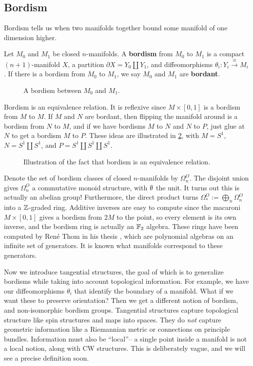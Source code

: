 \subsection*{Bordism}
Bordism tells us when two manifolds together bound some manifold of one dimension higher.
\begin{definition}[]
    Let $M_0$ and $M_1$ be closed $n$-manifolds. A \textbf{bordism} from $M_0$ to $M_1$ is a compact $(n+1)$-manifold $X$, a partition $\partial X=Y_0\amalg Y_1$, and diffeomorphisms $\theta _i  \colon Y_i  \xrightarrow{\cong} M_i $. If there is a bordism from $M_0$ to $M_1$, we say $M_0$ and $M_1$ are \textbf{bordant}.
\end{definition}

\begin{figure}
\centering
{}
\caption{A bordism between $M_0$ and $M_1$.}
\label{pair_of_pants}
\end{figure}

Bordism is an equivalence relation. It is reflexive since $M \times [0,1]$ is a bordism from $M$ to $M$. If $M$ and $N$ are bordant, then flipping the manifold around is a bordism from $N$ to $M$, and if we have bordisms $M$ to $N$ and $N$ to $P$, just glue at $N$ to get a bordism $M$ to $P$. These ideas are illustrated in \cref{equiv}, with $M=S^1 $, $N=S^1 \amalg S^1 $, and $P=S^1 \amalg S^1 \amalg S^1 $.

\begin{figure}[H]
\centering
{}
\caption{Illustration of the fact that bordism is an equivalence relation. }
\label{equiv}
\end{figure}

Denote the set of bordism classes of closed $n$-manifolds by $\Omega_n ^O $. The disjoint union gives $\Omega_n ^O$ a commutative monoid structure, with $\emptyset$ the unit. It turns out this is actually an abelian group! Furthermore, the direct product turns $\Omega_*^O:=\bigoplus _n  \Omega_n ^O$ into a $\mathbb{Z}$-graded ring. Additive inverses are easy to compute since the macaroni $M \times [0,1]$ gives a bordism from $2M$ to the point, so every element is its own inverse, and the bordism ring is actually an $\mathbb{F}_2$ algebra. These rings have been computed by Ren\'e Thom in his thesis \cite{thom}, which are polynomial algebras on an infinite set of generators. It is known what manifolds correspond to these generators. 

Now we introduce tangential structures, the goal of which is to generalize bordisms while taking into account topological information. For example, we have our diffeomorphisms $\theta_i $ that identify the boundary of a manifold. What if we want these to preserve orientation? Then we get a different notion of bordism, and non-isomorphic bordism groups. Tangential structures capture topological structure like spin structures and maps into spaces. They do \emph{not} capture geometric information like a Riemannian metric or connections on principle bundles. Information must also be ``local''-- a single point inside a manifold is not a local notion, along with CW structures. This is deliberately vague, and we will see a precise definition soon.

